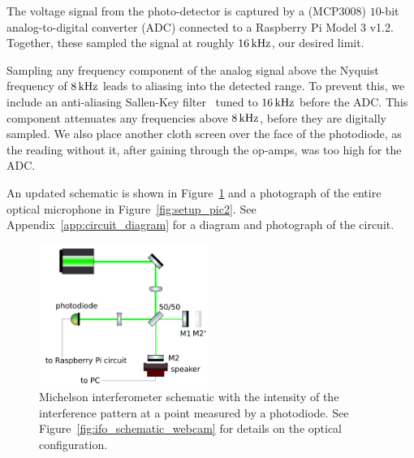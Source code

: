 \documentclass[paper-main.tex]{subfiles}
\begin{document}
The voltage signal from the photo-detector is captured by a (MCP3008) $10$-bit analog-to-digital converter (ADC) connected to a Raspberry Pi Model 3 v1.2. 
Together, these sampled the signal at roughly $16\,{\rm kHz}$, our desired limit.


Sampling any frequency component of the analog signal above the Nyquist frequency of $8\,{\rm kHz}$ leads to aliasing into the detected range. 
To prevent this, we include an anti-aliasing Sallen-Key filter~\cite{sallen_key_filter} tuned to $16\,{\rm kHz}$ before the ADC. 
This component attenuates any frequencies above $8\,{\rm kHz}$, before they are digitally sampled.
We also place another cloth screen over the face of the photodiode, as the reading without it, after gaining through the op-amps, was too high for the ADC.

An updated schematic is shown in Figure~\ref{fig:ifo_schematic_podo} and a photograph of the entire optical microphone in Figure~\ref{fig:setup_pic2}.
See Appendix~\ref{app:circuit_diagram} for a diagram and photograph of the circuit. 


\begin{figure}
	\includegraphics[width=0.49\textwidth]{figures/ifo_schematic_photodiode.pdf}
	\caption{Michelson interferometer schematic with the intensity of the interference pattern at a point measured by a photodiode. See Figure~\ref{fig:ifo_schematic_webcam} for details on the optical configuration.}
	\label{fig:ifo_schematic_podo}
\end{figure}
\end{document}
